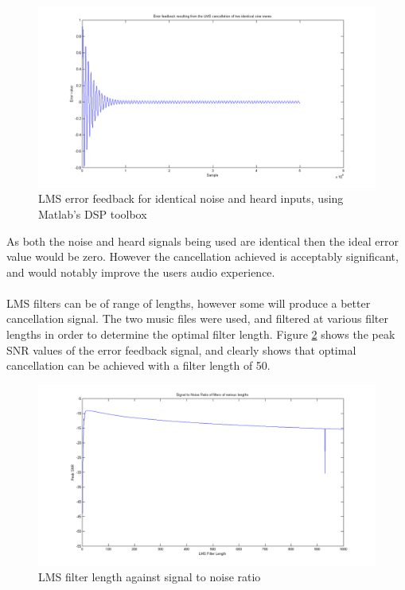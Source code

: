 \begin{figure}[H]
	\centering
	\includegraphics[width=\textwidth]{./img/lmssnr_cancel.png}
	\caption{LMS error feedback for identical noise and heard inputs, using Matlab's DSP toolbox}
	\label{fig:modellmscancel}
\end{figure}

\noindent As both the noise and heard signals being used are identical then the ideal error value would be zero.
However the cancellation achieved is acceptably significant, and would notably improve the users audio experience.
\\
\\
LMS filters can be of range of lengths, however some will produce a better cancellation signal.
The two music files were used, and filtered at various filter lengths in order to determine the optimal filter length.
Figure \ref{fig:modellmsfiltlen} shows the peak SNR values of the error feedback signal, and clearly shows that optimal cancellation can be achieved with a filter length of 50.

\begin{figure}[H]
	\centering
	\includegraphics[width=\textwidth]{./img/lmssnr_graph.png}
	\caption{LMS filter length against signal to noise ratio}
	\label{fig:modellmsfiltlen}
\end{figure}

